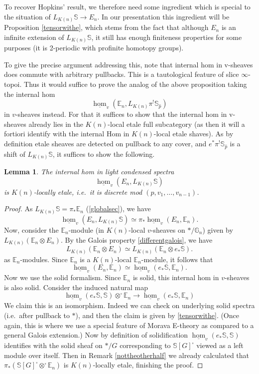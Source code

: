 \documentclass[12pt]{article}
\newtheorem{lemma}[theorem]{Lemma}
\newcommand{\on}{\operatorname}
\newcommand{\mbb}{\mathbb}
\newcommand{\solid}{\square}
\newcommand{\wh}{\widehat}
\begin{document}
To recover Hopkins' result, we therefore need some ingredient which is special to the situation of $L_{K(n)}\mbb{S}\to E_n$.  In our presentation this ingredient will be Proposition \ref{tensorwithe}, which stems from the fact that although $E_n$ is an infinite extension of $L_{K(n)}\mbb{S}$, it still has enough finiteness properties for some purposes (it is 2-periodic with profinite homotopy groups).


To give the precise argument addressing this, note that internal hom in v-sheaves does commute with arbitrary pullbacks.  This is a tautological feature of slice $\infty$-topoi.  Thus it would suffice to prove the analog of the above proposition taking the internal hom
$$\underline{\on{hom}}_v(\mbb{E}_n,L_{K(n)}\pi^!\mbb{S}_{\wh{p}})$$
in $v$-sheaves instead.  For that it suffices to show that the internal hom in v-sheaves already lies in the $K(n)$-local etale full subcategory (as then it will a fortiori identify with the internal Hom in $K(n)$-local etale shaves).  As by definition etale sheaves are detected on pullback to any cover, and $e^\ast \pi^!\mbb{S}_{\wh{p}}$ is a shift of $L_{K(n)}\mbb{S}$, it suffices to show the following.

\begin{lemma}
The internal hom in light condensed spectra
$$\underline{\on{hom}}_v(E_n,L_{K(n)}\mbb{S})$$
is $K(n)$-locally etale, i.e.\ it is discrete mod $(p,v_1,\ldots,v_{n-1})$.
\end{lemma}
\begin{proof}
As $L_{K(n)}\mbb{S} = \pi_\ast \mbb{E}_n$ (\ref{globalsec}), we have
$$\underline{\on{hom}}_v(E_n,L_{K(n)}\mbb{S}) \simeq \pi_\ast \underline{\on{hom}}_v(E_n,\mbb{E}_n).$$
Now, consider the $\mbb{E}_n$-module (in $K(n)$-local $v$-sheaves on $\ast/\mbb{G}_n$) given by $L_{K(n)}(\mbb{E}_n\otimes E_n)$.  By the Galois property \ref{differentgalois}, we have
$$L_{K(n)}(\mathbb{E}_n\otimes E_n) \simeq  L_{K(n)}(\mathbb{E}_n\otimes e_\ast \mbb{S}).$$
as $\mbb{E}_n$-modules.  Since $\mathbb{E}_n$ is a $K(n)$-local $\mathbb{E}_n$-module, it follows that
$$\underline{\on{hom}}_v(E_n,\mbb{E}_n) \simeq \underline{\on{hom}}_v(e_\ast \mbb{S},\mbb{E}_n).$$
Now we use the solid formalism.  Since $\mbb{E}_n$ is solid, this internal hom in $v$-sheaves is also solid.  Consider the induced natural map
$$\underline{\on{hom}}_v(e_\ast\mbb{S},\mbb{S})\otimes^\square\mathbb{E}_n\rightarrow \underline{\on{hom}}_v(e_\ast \mbb{S},\mbb{E}_n)$$
We claim this is an isomorphism.  Indeed we can check on underlying solid spectra (i.e.\ after pullback to $\ast$), and then the claim is given by \ref{tensorwithe}.  (Once again, this is where we use a special feature of Morava E-theory as compared to a general Galois extension.)  Now by definition of solidification $\underline{\on{hom}}_v(e_\ast\mbb{S},\mbb{S})$ identifies with the solid sheaf on $\ast/G$ corresponding to $\mathbb{S}[G]^\solid$ viewed as a left module over itself.  Then in Remark \ref{nottheotherhalf} we already calculated that $\pi_\ast(\mbb{S}[G]^\solid\otimes^\solid\mbb{E}_n)$ is $K(n)$-locally etale, finishing the proof.
\end{proof}
\end{document}
